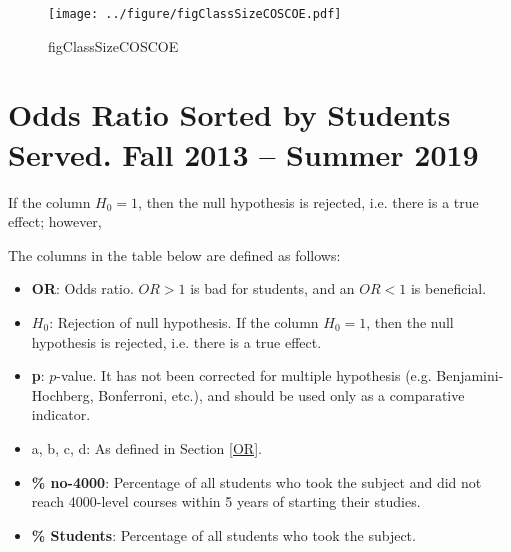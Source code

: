 \newpage

\vspace{\fill}
\begin{figure}[ht]
  \centering 
    \texttt{[image: ../figure/figClassSizeCOSCOE.pdf]}
    \caption{figClassSizeCOSCOE}
    \label{fig:../figure/figClassSizeCOSCOE}
\end{figure}


\newpage
\section{Odds Ratio Sorted by Students Served. Fall 2013 -- Summer 2019}

If the column $H_0 = 1$, then the null hypothesis is rejected, i.e. there is a true effect; however, 

The columns in the table below are defined as follows: 
\begin{itemize}
	\item \textbf{OR}: Odds ratio. $OR > 1$ is bad for students, and an $OR < 1$ is beneficial. 
	\item \textbf{$H_0$}: Rejection of null hypothesis. If the column $H_0 = 1$, then the null hypothesis is rejected, i.e. there is a true effect.
	\item \textbf{p}: $p$-value. It has not been corrected for multiple hypothesis (e.g. Benjamini-Hochberg, Bonferroni, etc.), and should be used only as a comparative indicator. 
	\item a, b, c, d: As defined in Section \ref{OR}. 
	\item \textbf{\% no-4000}: Percentage of all students who took the subject and did not reach 4000-level courses within 5 years of starting their studies. 
	\item \textbf{\% Students}: Percentage of all students who took the subject. 
\end{itemize}

